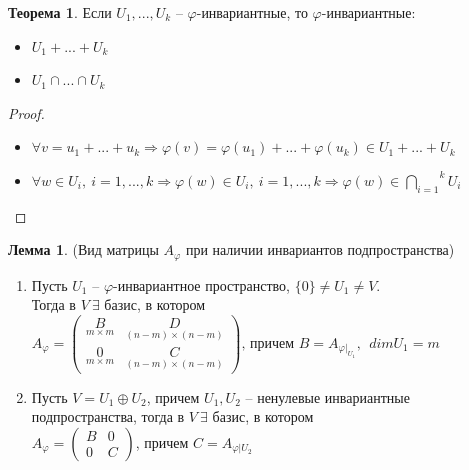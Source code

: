 \documentclass[a4paper, 12pt]{article}
\theoremstyle{definition}
\newtheorem*{theorem}{Теорема}
\newtheorem*{lemma}{Лемма}
\begin{document}
    \begin{theorem}
        Если $U_1,..., U_k$ -- $\varphi$-инвариантные, то $\varphi$-инвариантные:
        \begin{itemize}
            \item $U_1+...+U_k$
            \item $U_1 \cap...\cap U_k$ 
        \end{itemize}        
    \end{theorem}
    \begin{proof}
        \item
        \begin{itemize} 
            \item $\forall v = u_1 +...+ u_k \Longrightarrow 
            \varphi(v) = \varphi(u_1) +...+ \varphi(u_k) \in U_1 +
            ...+U_k$
            \item $\forall w \in U_i,\ i = 1,...,k \Longrightarrow 
            \varphi(w) \in U_i,\ i = 1,...,k \Longrightarrow 
            \varphi(w) \in \overset{k}{\underset{i=1}{\bigcap}} U_i$
        \end{itemize}
        
    \end{proof}
    \begin{lemma}
        (Вид матрицы $A_\varphi$ при наличии инвариантов 
        подпространства)
        \begin{enumerate}
            \item Пусть $U_1$ -- $\varphi$-инвариантное
            пространство, $\{0\} \neq U_1 \neq V$.\\ Тогда
            в $V\ \exists$ базис, в котором\\ $A_\varphi = 
            \begin{pmatrix}
                \underset{m\times m}{B} & \underset{(n-m)\times (n-m)}{D}\\
                \underset{m\times m}{0} & \underset{(n-m)\times (n-m)}{C} 
            \end{pmatrix} \text{, причем } B = A_{\varphi|_{U_1}},\ \  dimU_1 = m$ 
            \item Пусть $V = U_1 \oplus U_2$, причем $U_1, U_2$ --
            ненулевые инвариантные подпространства, тогда в
            $V\ \exists$ базис, в котором\\ $A_\varphi = 
            \begin{pmatrix}
                B & 0\\
                0 & C 
            \end{pmatrix}$, причем $C = A_{\varphi|U_2}$ 
        \end{enumerate}
    \end{lemma}
\end{document}
